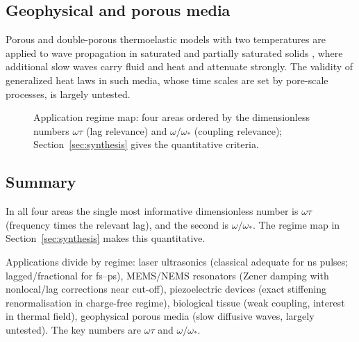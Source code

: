 \subsection{Geophysical and porous media}
Porous and double-porous thermoelastic models with two temperatures are applied to wave propagation in saturated and partially saturated solids \citep{Singh2020,Kumar2022,Kumar2025}, where additional slow waves carry fluid and heat and attenuate strongly. The validity of generalized heat laws in such media, whose time scales are set by pore-scale processes, is largely untested.

\begin{figure}[t!]\centering\small

\caption{Application regime map: four areas ordered by the dimensionless numbers $\omega\tau$ (lag relevance) and $\omega/\omega_*$ (coupling relevance); Section~\ref{sec:synthesis} gives the quantitative criteria.}\label{fig:applications-geo}
\end{figure}

\subsection{Summary}
In all four areas the single most informative dimensionless number is $\omega\tau$ (frequency times the relevant lag), and the second is $\omega/\omega_*$. The regime map in Section~\ref{sec:synthesis} makes this quantitative.

\begin{summarybox}[Summary]
Applications divide by regime: laser ultrasonics (classical adequate for ns pulses; lagged/fractional for fs--ps), MEMS/NEMS resonators (Zener damping with nonlocal/lag corrections near cut-off), piezoelectric devices (exact stiffening renormalisation in charge-free regime), biological tissue (weak coupling, interest in thermal field), geophysical porous media (slow diffusive waves, largely untested). The key numbers are $\omega\tau$ and $\omega/\omega_*$.
\end{summarybox}
